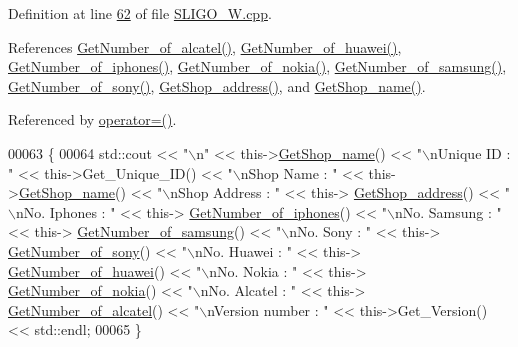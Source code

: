 Definition at line \hyperlink{_s_l_i_g_o___w_8cpp_source_l00062}{62} of file \hyperlink{_s_l_i_g_o___w_8cpp_source}{S\+L\+I\+G\+O\+\_\+\+W.\+cpp}.



References \hyperlink{_s_l_i_g_o___w_8cpp_source_l00073}{Get\+Number\+\_\+of\+\_\+alcatel()}, \hyperlink{_s_l_i_g_o___w_8cpp_source_l00089}{Get\+Number\+\_\+of\+\_\+huawei()}, \hyperlink{_s_l_i_g_o___w_8cpp_source_l00113}{Get\+Number\+\_\+of\+\_\+iphones()}, \hyperlink{_s_l_i_g_o___w_8cpp_source_l00081}{Get\+Number\+\_\+of\+\_\+nokia()}, \hyperlink{_s_l_i_g_o___w_8cpp_source_l00105}{Get\+Number\+\_\+of\+\_\+samsung()}, \hyperlink{_s_l_i_g_o___w_8cpp_source_l00097}{Get\+Number\+\_\+of\+\_\+sony()}, \hyperlink{_s_l_i_g_o___w_8cpp_source_l00129}{Get\+Shop\+\_\+address()}, and \hyperlink{_s_l_i_g_o___w_8cpp_source_l00121}{Get\+Shop\+\_\+name()}.



Referenced by \hyperlink{_s_l_i_g_o___w_8h_source_l00075}{operator=()}.


\begin{DoxyCode}
00063 \{
00064     std::cout << \textcolor{stringliteral}{"\(\backslash\)n"} <<  this->\hyperlink{class_s_l_i_g_o___w_ae788518e30d9d311eb28f37da932367a}{GetShop\_name}() << \textcolor{stringliteral}{"\(\backslash\)nUnique ID : "} << this->Get\_Unique\_ID() << \textcolor{stringliteral}{
      "\(\backslash\)nShop Name : "}  << this->\hyperlink{class_s_l_i_g_o___w_ae788518e30d9d311eb28f37da932367a}{GetShop\_name}() << \textcolor{stringliteral}{"\(\backslash\)nShop Address : "} << this->
      \hyperlink{class_s_l_i_g_o___w_a66a2315d531231e34c5056e9bc917797}{GetShop\_address}() << \textcolor{stringliteral}{"\(\backslash\)nNo. Iphones : "} << this->
      \hyperlink{class_s_l_i_g_o___w_a780b3a690f5cbbf7593ffc6612b3d743}{GetNumber\_of\_iphones}() << \textcolor{stringliteral}{"\(\backslash\)nNo. Samsung : "} << this->
      \hyperlink{class_s_l_i_g_o___w_aa4b6200a00c2a14924b7ff1ae3896b61}{GetNumber\_of\_samsung}() << \textcolor{stringliteral}{"\(\backslash\)nNo. Sony : "} << this->
      \hyperlink{class_s_l_i_g_o___w_a62822c4fb80f739bee61767238a29e14}{GetNumber\_of\_sony}() << \textcolor{stringliteral}{"\(\backslash\)nNo. Huawei : "} << this->
      \hyperlink{class_s_l_i_g_o___w_a5804f623f4eb290df4f6b3aba59230d6}{GetNumber\_of\_huawei}() << \textcolor{stringliteral}{"\(\backslash\)nNo. Nokia : "} << this->
      \hyperlink{class_s_l_i_g_o___w_a1aa9c9f001b37f3fdcdffae009319298}{GetNumber\_of\_nokia}() << \textcolor{stringliteral}{"\(\backslash\)nNo. Alcatel : "} << this->
      \hyperlink{class_s_l_i_g_o___w_a5afed1018d0629a1e08fc266d05a94d9}{GetNumber\_of\_alcatel}() << \textcolor{stringliteral}{"\(\backslash\)nVersion number : "} << this->Get\_Version() << std::endl;
00065 \}
\end{DoxyCode}


